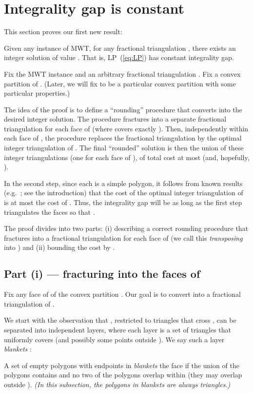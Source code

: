 \documentclass[final]{siamltex}
\newcommand{\refLP}{(\ref{eq:LP})\xspace}
\begin{document}
\section{Integrality gap is constant}  

This section proves our first new result:

\begin{theorem}\label{thm:gap}
  Given any instance  of MWT, 
  for any fractional triangulation ,
  there exists an integer solution of value .
  That is, LP~\refLP has constant integrality gap.
\end{theorem}
\proof
Fix the MWT instance  and an arbitrary fractional triangulation .
Fix a convex partition  of .
(Later, we will fix  to be a particular convex partition  with some particular properties.)

The idea of the proof is to define a ``rounding'' procedure that 
converts  into the desired integer solution.
The procedure fractures  into 
a separate fractional triangulation  
for each face  of 
(where  covers exactly ).
Then, independently within each face  of ,
the procedure replaces the fractional triangulation  
by the optimal integer triangulation of .
The final ``rounded'' solution is then the union
of these integer triangulations (one for each face  of ),
of total cost at most  (and, hopefully, ).

In the second step, since each  is a simple polygon, it follows from 
known results (e.g.~\cite[Thm.~7]{dantzig1985triangulations}; see the introduction)
that the cost of the optimal integer triangulation of  is at most the cost of .
Thus, the integrality gap will be 
as long as the first step triangulates the faces so that
.

The proof divides into two parts:
(i) describing a correct rounding procedure that fractures  
into a fractional triangulation  
for each face  of 
(we call this {\em transposing}  into )
and
(ii) bounding the cost  by .

\subsection{Part (i) --- fracturing  into the faces of }
\label{sec:part i} \label{sec:feasibility}
Fix any face  of  of the convex partition .
Our goal is to convert  into a fractional triangulation
 of .

We start with the observation that , restricted to triangles that cross ,
can be separated into independent layers, 
where each layer is a set of triangles that uniformly covers 
(and possibly some points outside ).
We say such a layer {\em blankets} :
\begin{definition}[blanket]\label{def:blanket}
A set  of empty polygons with endpoints in 
  {\em blankets} the face  
  if the union of the polygons contains 
  and no two of the polygons overlap within 
  (they may overlap outside ).
  {\em (In this subsection, the polygons in blankets are always triangles.)}
\end{definition}
\end{document}
